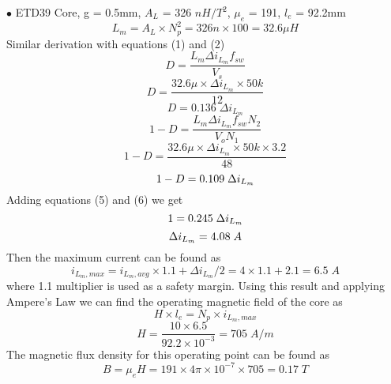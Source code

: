 $\bullet$ ETD39 Core, g = 0.5mm, $A_L$ = 326 $nH/T^2$, $\mu_e$ = 191, $l_e$ = 92.2mm
\begin{equation*}
    L_m = A_L \times N_p^2 = 326n \times 100 = 32.6 \mu H
\end{equation*}
Similar derivation with equations (1) and (2)
\begin{equation*}
    D = \frac{L_m \Delta i_{L_m} f_{sw}}{V_s}
\end{equation*}
\begin{equation*}
    D = \frac{32.6\mu \times \Delta i_{L_m} \times 50k}{12}
\end{equation*}
\begin{equation}
    D = 0.136 \; \Delta i_{L_m}
\end{equation}
\begin{equation*}
    1-D = \frac{L_m \Delta i_{L_m} f_{sw} N_2}{V_o N_1}
\end{equation*}
\begin{equation*}
    1-D = \frac{32.6\mu \times \Delta i_{L_m} \times 50k \times 3.2}{48}
\end{equation*}
\begin{equation}  \\
    1-D = 0.109 \; \Delta i_{L_m}
\end{equation}
Adding equations (5) and (6) we get
\begin{equation*}  \\
    1 = 0.245 \; \Delta i_{L_m}
\end{equation*}
\begin{equation*}  \\
    \Delta i_{L_m} = 4.08 \; A
\end{equation*}
Then the maximum current can be found as
\begin{equation*}
    i_{L_m,max} = i_{L_m,avg} \times 1.1 + \Delta i_{L_m}/2 = 4 \times 1.1 + 2.1 = 6.5 \; A
\end{equation*}
where 1.1 multiplier is used as a safety margin. Using this result and applying Ampere's Law we can find the operating magnetic field of the core as
\begin{equation*}
    H \times l_e = N_p \times i_{L_m,max}
\end{equation*}
\begin{equation*}
    H = \frac{10 \times 6.5}{92.2 \times 10^{-3}} = 705 \; A/m
\end{equation*}
The magnetic flux density for this operating point can be found as
\begin{equation*}
    B = \mu_e H = 191 \times 4\pi \times 10^{-7} \times 705 = 0.17 \; T
\end{equation*}
